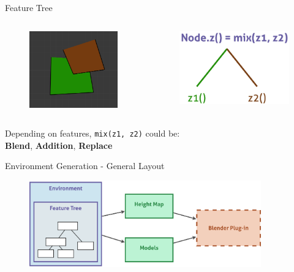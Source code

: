 \documentclass{beamer}
\begin{document}
\begin{frame}{Feature Tree}
  \begin{columns}[c]
    \begin{figure}
      \begin{center}
        \includegraphics[width=4cm]{feature_2}
      \end{center}
    \end{figure}

    \begin{figure}
      \begin{center}
        \includegraphics[width=5cm]{mix}
      \end{center}
    \end{figure}
  \end{columns}

  \vfill
  Depending on features, \texttt{mix(z1, z2)} could be: \\
  \hspace*{8em} \textbf{Blend}, \textbf{Addition}, \textbf{Replace}
\end{frame}

\begin{frame}{Environment Generation - General Layout}
  \begin{figure}
    \begin{center}
      \includegraphics[width=10cm]{env_global.pdf}
    \end{center}
  \end{figure}
\end{frame}
\end{document}
